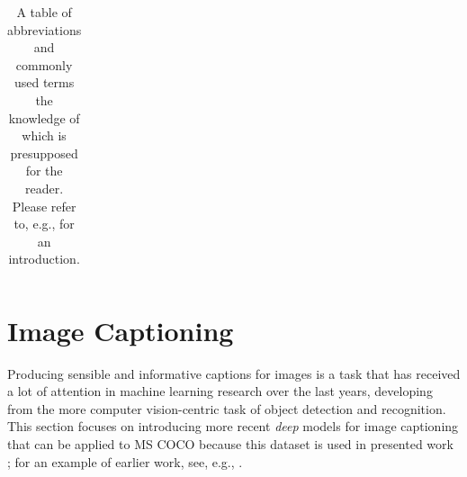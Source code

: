 \begin{table}[]
\begin{tabularx}{\textwidth}{|X|X|}
	\end{tabularx}
\caption{\label{tab:defs}A table of abbreviations and commonly used terms the knowledge of which is presupposed for the reader. Please refer to, e.g., \cite{goodfellow2016deep} for an introduction.}

\end{table}


\section{Image Captioning}
\label{image_captioning}
Producing sensible and informative captions for images is a task that has received a lot of attention in machine learning research over the last years, developing from the more computer vision-centric task of object detection and recognition. %
This section focuses on introducing more recent \textit{deep} models for image captioning that can be applied to MS COCO because this dataset is used in presented work \parencite{lecun2015deep}; for an example of earlier work, see, e.g., \cite{kulkarni2013babytalk}.

